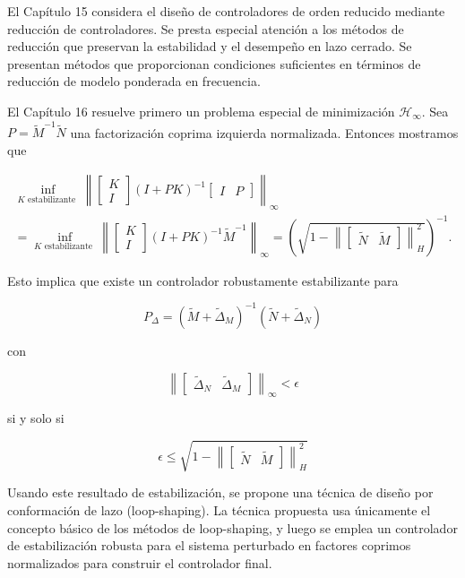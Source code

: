 \documentclass[11pt]{article}
\begin{document}
El Capítulo 15 considera el diseño de controladores de orden reducido mediante reducción de controladores. Se presta especial atención a los métodos de reducción que preservan la estabilidad y el desempeño en lazo cerrado. Se presentan métodos que proporcionan condiciones suficientes en términos de reducción de modelo ponderada en frecuencia.

El Capítulo 16 resuelve primero un problema especial de minimización $\mathcal{H}_{\infty}$. Sea $P=\tilde{M}^{-1} \tilde{N}$ una factorización coprima izquierda normalizada. Entonces mostramos que

$$
\begin{aligned}
\inf _{K \text { estabilizante }}\left\|\left[\begin{array}{c}
K \\
I
\end{array}\right](I+P K)^{-1}\left[\begin{array}{ll}
I & P
\end{array}\right]\right\|_{\infty} \\
=\inf _{K \text { estabilizante }}\left\|\left[\begin{array}{c}
K \\
I
\end{array}\right](I+P K)^{-1} \tilde{M}^{-1}\right\|_{\infty}=\left(\sqrt{1-\left\|\left[\begin{array}{ll}
\tilde{N} & \tilde{M}
\end{array}\right]\right\|_{H}^{2}}\right)^{-1} .
\end{aligned}
$$

Esto implica que existe un controlador robustamente estabilizante para

$$
P_{\Delta}=\left(\tilde{M}+\tilde{\Delta}_{M}\right)^{-1}\left(\tilde{N}+\tilde{\Delta}_{N}\right)
$$

con

$$
\left\|\left[\begin{array}{ll}
\tilde{\Delta}_{N} & \tilde{\Delta}_{M}
\end{array}\right]\right\|_{\infty}<\epsilon
$$

si y solo si

$$
\epsilon \leq \sqrt{1-\left\|\left[\begin{array}{ll}
\tilde{N} & \tilde{M}
\end{array}\right]\right\|_{H}^{2}}
$$

Usando este resultado de estabilización, se propone una técnica de diseño por conformación de lazo (loop-shaping). La técnica propuesta usa únicamente el concepto básico de los métodos de loop-shaping, y luego se emplea un controlador de estabilización robusta para el sistema perturbado en factores coprimos normalizados para construir el controlador final.
\end{document}
